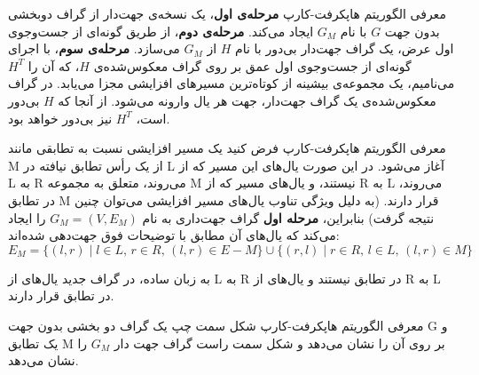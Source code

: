 \begin{itemframe}{‌معرفی الگوریتم هاپکرفت-کارپ}
\itm
\textbf{مرحله‌ی اول}،
یک نسخه‌ی جهت‌دار از گراف دوبخشی بدون جهت $G$ با نام $G_M$ ایجاد می‌کند.
\itm
\textbf{مرحله‌ی دوم}،
از طریق گونه‌ای از جست‌وجوی اول عرض، یک گراف جهت‌دار بی‌دور با نام $H$ از $G_M$ می‌سازد.
\itm
\textbf{مرحله‌ی سوم}،
با اجرای گونه‌ای از جست‌وجوی اول عمق بر روی گراف معکوس‌شده‌ی $H$، که آن را $H^T$ می‌نامیم، یک مجموعه‌ی بیشینه از کوتاه‌ترین مسیرهای افزایشی مجزا می‌یابد.
\itm
در گراف معکوس‌شده‌ی یک گراف جهت‌دار، جهت هر یال وارونه می‌شود. از آنجا که $H$ بی‌دور است، $H^T$ نیز بی‌دور خواهد بود.
\end{itemframe}

\begin{itemframe}{‌معرفی الگوریتم هاپکرفت-کارپ}
\itm
فرض کنید یک مسیر افزایشی نسبت به تطابقی مانند M از یک رأس تطابق نیافته در L آغاز می‌شود.
\itm
در این صورت یال‌های این مسیر که از L به R می‌روند، متعلق به مجموعه M نیستند، و یال‌های مسیر که از R به L می‌روند، در تطابق M قرار دارند. (به دلیل ویژگی تناوب یال‌های مسیر افزایشی می‌توان چنین نتیجه گرفت)
\itm
بنابراین، \textbf{مرحله اول} گراف جهت‌داری به نام
$G_M = (V, E_M)$
را ایجاد می‌کند که یال‌های آن مطابق با توضیحات فوق جهت‌دهی شده‌اند:
$$
E_M = \{ (l, r) \mid l \in L,\, r \in R,\, (l, r) \in E - M \} \cup \{ (r, l) \mid r \in R,\, l \in L,\, (l, r) \in M \}
$$

\itm
به زبان ساده، در گراف جدید یال‌های از L به R در تطابق نیستند و یال‌های از R به L در تطابق قرار دارند.
\end{itemframe}

\begin{itemframe}{‌معرفی الگوریتم هاپکرفت-کارپ}
\itm
شکل سمت چپ یک گراف دو بخشی بدون جهت G و یک تطابق M بر روی آن را نشان می‌دهد و شکل سمت راست گراف جهت دار $G_M$ را نشان می‌دهد.
\begin{figure}[h]
  \centering
  \begin{minipage}{0.45\textwidth}
  \end{minipage}
  \hfill
  \begin{minipage}{0.45\textwidth}
  \end{minipage}
\end{figure}

\end{itemframe}

